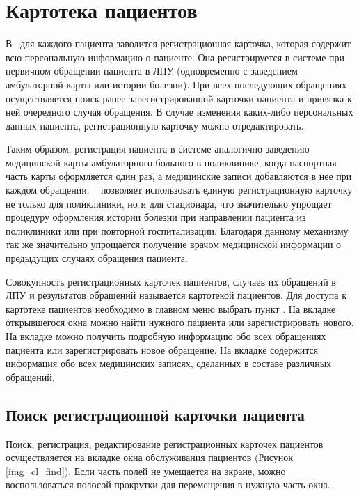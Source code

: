 \newpage
\section{Картотека пациентов}

В \tmis ~для каждого пациента заводится регистрационная карточка, которая содержит всю персональную информацию о пациенте. Она регистрируется в системе при первичном обращении пациента в ЛПУ (одновременно с заведением амбулаторной карты или истории болезни). При всех последующих обращениях осуществляется поиск ранее зарегистрированной карточки пациента и привязка к ней очередного случая обращения. В случае изменения каких-либо персональных данных пациента, регистрационную карточку можно отредактировать. 

Таким образом, регистрация пациента в системе аналогично заведению медицинской карты амбулаторного больного в поликлинике, когда паспортная часть карты оформляется один раз, а медицинские записи добавляются в нее при каждом обращении. \tmis~ позволяет использовать единую регистрационную карточку не только для поликлиники, но и для стационара, что значительно упрощает процедуру оформления истории болезни при направлении пациента из поликлиники или при повторной госпитализации. Благодаря данному механизму так же значительно упрощается получение врачом медицинской информации о предыдущих случаях обращения пациента.

Совокупность регистрационных карточек пациентов, случаев их обращений в ЛПУ и результатов обращений называется картотекой пациентов. Для доступа к картотеке пациентов необходимо в главном меню выбрать пункт . На вкладке  открывшегося окна можно найти нужного пациента или зарегистрировать нового. На вкладке  можно получить подробную информацию обо всех обращениях пациента или зарегистрировать новое обращение. На вкладке  содержится информация обо всех медицинских записях, сделанных в составе различных обращений.

\subsection{Поиск регистрационной карточки пациента} \label{cl_find}

Поиск, регистрация, редактирование регистрационных карточек пациентов осуществляется на вкладке  окна обслуживания пациентов (Рисунок \ref{img_cl_find}). Если часть полей не умещается на экране, можно воспользоваться полосой прокрутки для перемещения в нужную часть окна.

